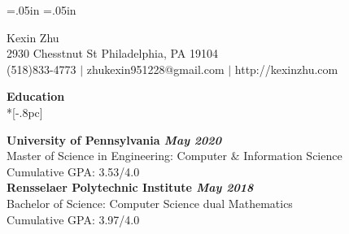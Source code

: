 \oddsidemargin=.05in
\evensidemargin=.05in
\textwidth=6.3in
\topmargin=-1.0in
\textheight=9in
\parindent=0in
\pagestyle{empty}

\newenvironment{list1}{
  \begin{list}{\ding{113}}{%
      \setlength{\itemsep}{0in}
      \setlength{\parsep}{0in} \setlength{\parskip}{0in}
      \setlength{\topsep}{0in} \setlength{\partopsep}{0in}
      \setlength{\leftmargin}{0.17in}}}{\end{list}}
\newenvironment{list2}{
  \begin{list}{$\bullet$}{%
      \setlength{\itemsep}{0in}
      \setlength{\parsep}{0in} \setlength{\parskip}{0in}
      \setlength{\topsep}{0in} \setlength{\partopsep}{0in}
      \setlength{\leftmargin}{0.2in}}}{\end{list}}

\vspace*{-.05in}


\begin{center}
{\Large Kexin Zhu} \\[.5pc]

2930 Chesstnut St Philadelphia, PA 19104\\
(518)833-4773 $|$ zhukexin951228@gmail.com $|$ http://kexinzhu.com  \\
\end{center}



{\large \bf Education} \\*[-.8pc]
\underline{\hspace{6.3in}} 

{\bf University of Pennsylvania \hfill \it May 2020 }\\
\rm Master of Science in Engineering:  Computer $\&$ Information Science \rm \\
Cumulative GPA: 3.53/4.0\rm\\

{\bf Rensselaer Polytechnic Institute \hfill \it May 2018 }\\
Bachelor of Science:  Computer Science  dual  Mathematics \rm \\
\rm Cumulative GPA: 3.97/4.0   \\
%




